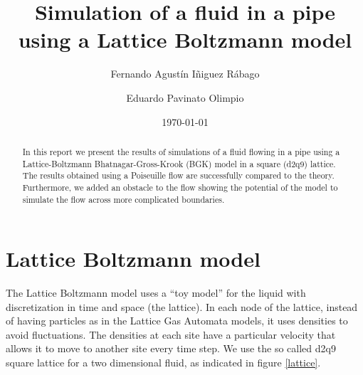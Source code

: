 \documentclass[aps,prl,reprint,groupedaddress]{revtex4-1}
\begin{document}
\title{Simulation of a fluid in a pipe using a Lattice Boltzmann model}

\author{Fernando Agust\'in I\~niguez R\'abago}
\author{Eduardo Pavinato Olimpio}


\date{\today}

\begin{abstract}
In this report we present the results of simulations of a fluid flowing in a pipe using a Lattice-Boltzmann Bhatnagar-Gross-Krook (BGK) model in a square (d2q9) lattice. The results obtained using a Poiseuille flow are successfully compared to the theory. Furthermore, we added an obstacle to the flow showing the potential of the model to simulate the flow across more complicated boundaries. 
\end{abstract}

\maketitle


\section{Lattice Boltzmann model}

The Lattice Boltzmann model uses a ``toy model'' for the liquid with discretization in time and space (the lattice). In each node of the lattice, instead of having particles as in the Lattice Gas Automata models, it uses densities to avoid fluctuations. The densities at each site have a particular velocity that allows it to move to another site every time step. We use the so called d2q9 square lattice for a two dimensional fluid, as indicated in figure \ref{lattice}.
\end{document}
